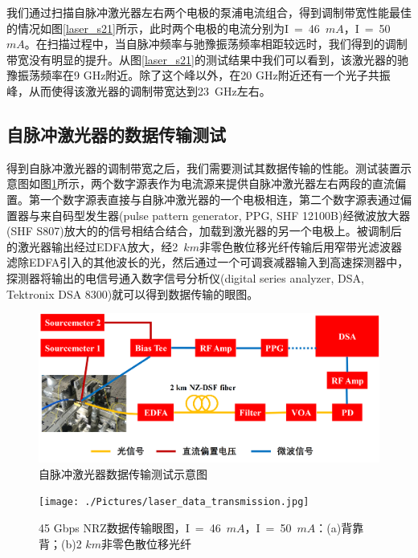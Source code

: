 我们通过扫描自脉冲激光器左右两个电极的泵浦电流组合，得到调制带宽性能最佳的情况如图\ref{laser_s21}所示，此时两个电极的电流分别为I~=~46~$mA$，I~=~50~$mA$。在扫描过程中，当自脉冲频率与驰豫振荡频率相距较远时，我们得到的调制带宽没有明显的提升。从图\ref{laser_s21}的测试结果中我们可以看到，该激光器的驰豫振荡频率在9 GHz附近。除了这个峰以外，在20 GHz附近还有一个光子共振峰，从而使得该激光器的调制带宽达到23~GHz左右。

\subsection{自脉冲激光器的数据传输测试}



得到自脉冲激光器的调制带宽之后，我们需要测试其数据传输的性能。测试装置示意图如图\ref{laser_data_transmission_setup}所示，两个数字源表作为电流源来提供自脉冲激光器左右两段的直流偏置。第一个数字源表直接与自脉冲激光器的一个电极相连，第二个数字源表通过偏置器与来自码型发生器(pulse pattern generator, PPG, SHF 12100B)经微波放大器(SHF S807)放大的的信号相结合结合，加载到激光器的另一个电极上。被调制后的激光器输出经过EDFA放大，经2~$km$非零色散位移光纤传输后用窄带光滤波器滤除EDFA引入的其他波长的光，然后通过一个可调衰减器输入到高速探测器中，探测器将输出的电信号通入数字信号分析仪(digital series analyzer, DSA, Tektronix DSA 8300)就可以得到数据传输的眼图。

\begin{figure}[htb]
	\centering
	\includegraphics[width=15cm]{./Pictures/laser_data_transmission_setup.jpg}
	\captionsetup{justification=centering}
	\caption{自脉冲激光器数据传输测试示意图}
	\label{laser_data_transmission_setup}
\end{figure}

\begin{figure}[htb]
	\centering
	\texttt{[image: ./Pictures/laser\_data\_transmission.jpg]}
	\captionsetup{justification=centering}
	\caption{45 Gbps NRZ数据传输眼图，I~=~46~$mA$，I~=~50~$mA$：(a)背靠背；(b)2 $km$非零色散位移光纤\cite{shahin201845}}
	\label{laser_data_transmission}
\end{figure}

